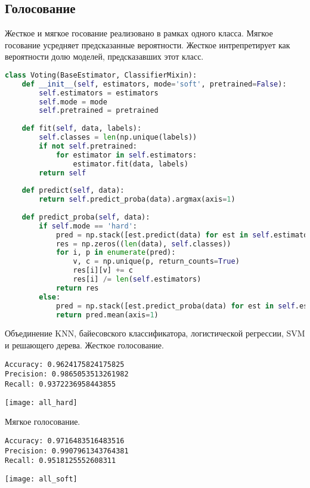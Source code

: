 \subsection*{Голосование}

Жесткое и мягкое госование реализовано в рамках одного класса. Мягкое госование усредняет предсказанные вероятности. Жесткое интрепретирует как вероятности долю моделей, предсказавших этот класс.

\begin{lstlisting}[language=python, keepspaces=true]
class Voting(BaseEstimator, ClassifierMixin):
    def __init__(self, estimators, mode='soft', pretrained=False):
        self.estimators = estimators
        self.mode = mode
        self.pretrained = pretrained
    
    def fit(self, data, labels):
        self.classes = len(np.unique(labels))
        if not self.pretrained:
            for estimator in self.estimators:
                estimator.fit(data, labels)
        return self
    
    def predict(self, data):
        return self.predict_proba(data).argmax(axis=1)
        
    def predict_proba(self, data):
        if self.mode == 'hard':
            pred = np.stack([est.predict(data) for est in self.estimators], axis=-1)
            res = np.zeros((len(data), self.classes))
            for i, p in enumerate(pred):
                v, c = np.unique(p, return_counts=True)
                res[i][v] += c
                res[i] /= len(self.estimators)
            return res
        else:
            pred = np.stack([est.predict_proba(data) for est in self.estimators], axis=1)
            return pred.mean(axis=1)
\end{lstlisting}
\pagebreak

Объединение KNN, байесовского классификатора, логистической регрессии, SVM и решающего дерева. Жесткое голосование.
\begin{lstlisting}[frame=none, numbers=none]
Accuracy: 0.9624175824175825
Precision: 0.9865053513261982
Recall: 0.9372236958443855
\end{lstlisting}
\begin{center}
\texttt{[image: all\_hard]}
\end{center}

Мягкое голосование.
\begin{lstlisting}[frame=none, numbers=none]
Accuracy: 0.9716483516483516
Precision: 0.9907961343764381
Recall: 0.9518125552608311
\end{lstlisting}
\begin{center}
\texttt{[image: all\_soft]}
\end{center}


